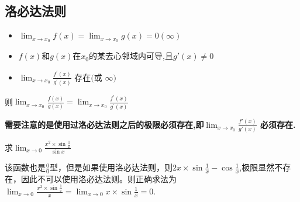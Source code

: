 \documentclass[12pt, a4paper, oneside, UTF8]{ctexbook}
\begin{document}
\begin{sloppypar}
    \subsection{洛必达法则}
    \begin{defn}{}{}
        \begin{itemize}
            \item $\lim_{x\to x_0}f(x)=\lim_{x\to x_0}g(x)=0(\infty)$
            \item $f(x)$和$g(x)$在$x_0$的某去心邻域内可导,且$g'(x) \neq 0$
            \item $\lim_{x\to x_0}\frac{f^{\prime}(x)}{g^{\prime}(x)}\text{ 存在(或 }\infty)$
        \end{itemize}
        则$\lim_{x\to x_{0}}\frac{f(x)}{g(x)}=\lim_{x\to x_{0}}\frac{f^{'}(x)}{g^{'}(x)}$
    \end{defn}
    \textbf{需要注意的是使用过洛必达法则之后的极限必须存在,即$\lim _{x \to x_0}\frac{f'(x)}{g'(x)}$ 必须存在.}
    \begin{problem}
    求$\lim _{x \to 0}\frac{x^2 \times \sin \frac{1}{x}}{\sin x}$
    \end{problem}
    \begin{solution}
        该函数也是$\frac{0}{0}$型，但是如果使用洛必达法则，则$2x \times \sin \frac{1}{x}-\cos \frac{1}{x}$,极限显然不存在，因此不可以使用洛必达法则。则正确求法为$\lim _{x\to 0}\frac{x^2\times \sin \frac{1}{x}}{x}=\lim_{x\to 0}x\times\sin\frac{1}{x}=0$.
    \end{solution}

\end{sloppypar}
\end{document}
